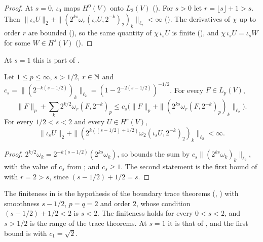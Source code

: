 \begin{proof}
\leanok
At $s = 0$, $\iota_0$ maps $H^0(V)$ onto $L_2(V)$ (). For $s > 0$ let
$r = \lfloor s \rfloor + 1 > s$. Then $\|\iota_s U\|_2 + \|(2^{ks} \omega_r(\iota_s U,
2^{-k})_2)_k\|_{\ell_2} < \infty$ (). The derivatives of
$\chi$ up to order $r$ are bounded (), so the same quantity of
$\chi \, \iota_s U$ is finite (), and $\chi \, \iota_s U = \iota_s W$ for
some $W \in H^s(V)$ ().
\end{proof}

At $s = 1$ this is part of .

\begin{lemma}
\label{lem:besov-half-one-general}
\leanok
{}
Let $1 \leq p \leq \infty$, $s > 1/2$, $r \in \mathbb{N}$ and
$c_s = \|(2^{-k(s - 1/2)})_k\|_{\ell_2} = (1 - 2^{-2(s - 1/2)})^{-1/2}$. For every
$F \in L_p(V)$,
\[
  \|F\|_p + \sum_k 2^{k/2} \omega_r(F, 2^{-k})_p
  \leq c_s \bigl(\|F\|_p + \|(2^{ks} \omega_r(F, 2^{-k})_p)_k\|_{\ell_2}\bigr) .
\]
For every $1/2 < s < 2$ and every $U \in H^s(V)$,
\[
  \|\iota_s U\|_2 + \|(2^{k((s - 1/2) + 1/2)} \omega_2(\iota_s U, 2^{-k})_2)_k\|_{\ell_2}
  < \infty .
\]
\end{lemma}

\begin{proof}
\leanok
$2^{k/2} \omega_k = 2^{-k(s - 1/2)} (2^{ks} \omega_k)$, so
 bounds the sum by
$c_s \|(2^{ks} \omega_k)_k\|_{\ell_2}$, with the value of $c_s$ from ;
and $c_s \geq 1$. The second statement is the first bound of 
with $r = 2 > s$, since $(s - 1/2) + 1/2 = s$.
\end{proof}

The finiteness in  is the hypothesis of the boundary trace
theorems (, ) with smoothness
$s - 1/2$, $p = q = 2$ and order $2$, whose condition $(s - 1/2) + 1/2 < 2$ is $s < 2$. The
finiteness holds for every $0 < s < 2$, and $s > 1/2$ is the range of the trace theorems. At
$s = 1$ it is that of
, and the first bound is  with
$c_1 = \sqrt 2$.

